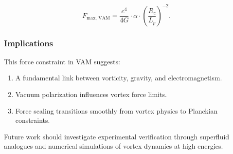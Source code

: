 \begin{equation*}
    F_\text{max, VAM} = \frac{c^4}{4G} \cdot \alpha \cdot \left(\frac{R_c}{L_p}\right)^{-2}.
\end{equation*}


\subsubsection*{Implications}
This force constraint in VAM suggests:
\begin{enumerate}
    \item A fundamental link between vorticity, gravity, and electromagnetism.
    \item Vacuum polarization influences vortex force limits.
    \item Force scaling transitions smoothly from vortex physics to Planckian constraints.
\end{enumerate}


Future work should investigate experimental verification through superfluid analogues and numerical simulations of vortex dynamics at high energies.